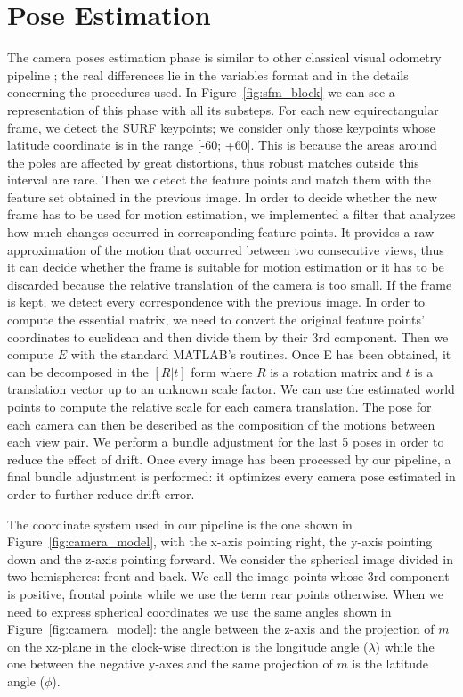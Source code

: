 \section{Pose Estimation}
\label{sec:pipeline_pose_estimation}
The camera poses estimation phase is similar to other classical visual 
odometry pipeline \cite{scaramuzzaVisualOdometryI,moravec1980obstacle};
the real differences lie in the variables format and in 
the details concerning the procedures used. In Figure~\ref{fig:sfm_block} we can 
see a representation of this phase with all its substeps.
For each new equirectangular frame, we detect the
SURF keypoints; we consider only those keypoints whose latitude coordinate is in
the range [-60\degree; +60\degree]. This is because the areas around the poles 
are affected by great distortions, thus robust matches outside this interval are
rare.
Then we detect the feature points and match them with the feature set 
obtained in the previous image.
%
In order to decide whether the new frame has to be used for motion estimation, 
we implemented a filter that analyzes how much changes occurred in 
corresponding feature points. It provides a raw approximation of the 
motion that occurred between two consecutive views, thus it can decide whether 
the frame is suitable for motion estimation or it has to be discarded because 
the relative translation of the camera is too small.
%
If the frame is kept, we detect every correspondence with the previous image.
In order to compute the essential matrix, we need to convert the original 
feature points' coordinates to euclidean and then divide them by their 3rd 
component. Then we compute $E$ with the standard MATLAB's routines.
Once E has been obtained, it can be decomposed in the \([R|t]\)
form where $R$ is a rotation matrix and $t$ is a translation vector up to 
an unknown scale factor.
We can use the estimated world points to compute the relative scale for each
camera translation.
The pose for each camera can then be described as the composition of the 
motions between each view pair. We perform a bundle adjustment for the last 5 
poses in order to reduce the effect of drift.
Once every image has been processed by our pipeline, a final 
bundle adjustment is performed: it optimizes every camera pose estimated in order to 
further reduce drift error.

The coordinate system used in our pipeline is the one shown in 
Figure~\ref{fig:camera_model}, with the x-axis pointing right, the y-axis 
pointing down and the z-axis pointing forward.
We consider the spherical image divided in two hemispheres: front and back.
We call the image points 
whose 3rd component is positive, frontal points while we use the term rear 
points otherwise.
When we need to express spherical coordinates we use the same angles shown in 
Figure~\ref{fig:camera_model}:
the angle between the z-axis and the projection of $m$ on the xz-plane in 
the clock-wise direction is the longitude angle ($\lambda$) while the one 
between the negative y-axes and the same projection of $m$ is the latitude 
angle ($\phi$).


